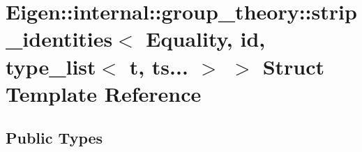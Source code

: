 \hypertarget{struct_eigen_1_1internal_1_1group__theory_1_1strip__identities_3_01_equality_00_01id_00_01type__f08cc45c8ea5d12fcc4f4eb6bf8771ff}{}\section{Eigen\+:\+:internal\+:\+:group\+\_\+theory\+:\+:strip\+\_\+identities$<$ Equality, id, type\+\_\+list$<$ t, ts... $>$ $>$ Struct Template Reference}
\label{struct_eigen_1_1internal_1_1group__theory_1_1strip__identities_3_01_equality_00_01id_00_01type__f08cc45c8ea5d12fcc4f4eb6bf8771ff}
\subsection*{Public Types}
